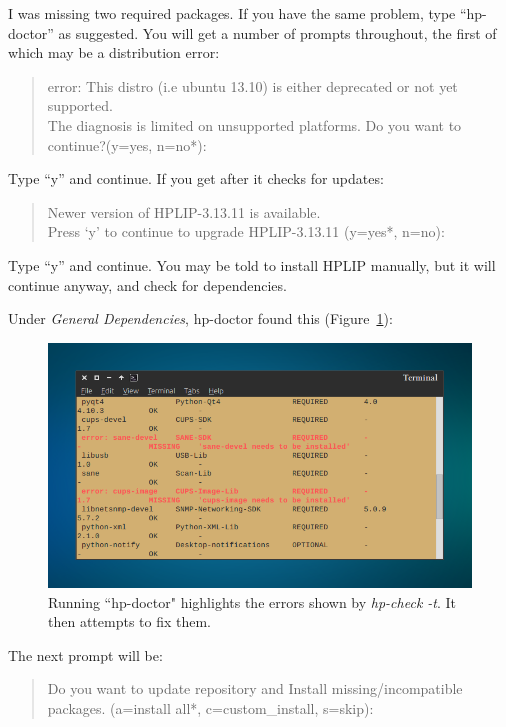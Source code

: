 \documentclass[12pt, a4paper]{article}
\begin{document}
\noindent I was missing two required packages. If you have the same problem, type “hp-doctor” as suggested. You will get a number of prompts throughout, the first of which may be a distribution error:

\begin{quote}error: This distro (i.e ubuntu 13.10) is either deprecated or not yet supported.\\
The diagnosis is limited on unsupported platforms. Do you want to continue?(y=yes, n=no*):
\end{quote}

\noindent Type “y” and continue. If you get after it checks for updates:

\begin{quote}
Newer version of HPLIP-3.13.11 is available.\\
Press `y' to continue to upgrade HPLIP-3.13.11 (y=yes*, n=no):
\end{quote}

\noindent Type “y” and continue. You may be told to install HPLIP manually, but it will continue anyway, and check for dependencies.

Under \emph{General Dependencies}, hp-doctor found this (Figure~\ref{fig10}):

\newpage
\begin{figure}[!htp]
  \centering
  \includegraphics[width=1\textwidth]{imgs/filter-failed-11.png}
  \caption{Running ``hp-doctor" highlights the errors shown by \emph{hp-check -t}. It then attempts to fix them.}
  \label{fig10}
\end{figure}

\noindent The next prompt will be:

\begin{quote}
Do you want to update repository and Install missing/incompatible packages. (a=install all*, c=custom\_install, s=skip):
\end{quote}
\end{document}
